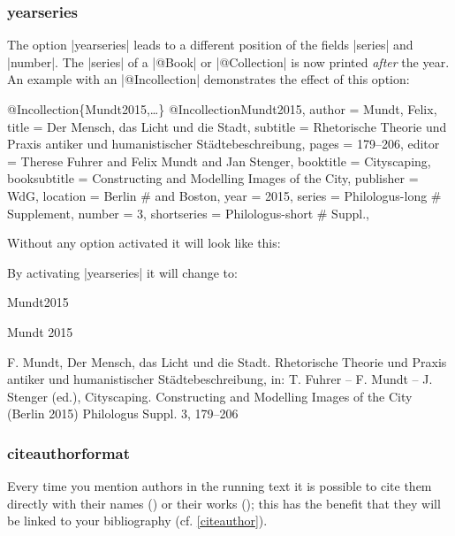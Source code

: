\documentclass[a4paper,
10pt,
greek,
french,
spanish,
italian,
ngerman,
english
]{ltxdoc}
\begin{document}

\subsubsection{yearseries}\label{yearseries}
The option |yearseries| leads to a different position of the fields |series| and |number|.
The |series| of a |@Book| or |@Collection| is now printed \emph{after} the year.
An example with an |@Incollection| demonstrates the effect of this option:
 
\begin{bibexample}[label=Mundt2015]{{@}Incollection\{Mundt2015,…\}}
@Incollection{Mundt2015,
  author       = {Mundt, Felix},
  title        = {Der Mensch, das Licht und die Stadt},
  subtitle     = {Rhetorische Theorie und Praxis antiker und humanistischer Städtebeschreibung},
  pages        = {179--206},
  editor       = {Therese Fuhrer and Felix Mundt and Jan Stenger},
  booktitle    = {Cityscaping},
  booksubtitle = {Constructing and Modelling Images of the City},
  publisher    = WdG,
  location     = Berlin #{ and Boston}, %
  year         = {2015},
  series       = Philologus-long #{ Supplement},
  number       = {3},
  shortseries  = Philologus-short #{ Suppl.},
}
\end{bibexample}

Without any option activated it will look like this:
 
By activating |yearseries| it will change to:
\begin{bibbox}{Mundt2015}\footnotesize
\parbox[t]{1.7cm}{Mundt 2015} \parbox[t]{9cm}{F. Mundt, Der Mensch, das Licht und die Stadt. Rhetorische Theorie und Praxis antiker und humanistischer Städtebeschreibung, in: T. Fuhrer -- F. Mundt -- J. Stenger (ed.), Cityscaping. Constructing and Modelling Images of the City (Berlin 2015) {\color{red}Philologus Suppl. 3,} 179–206}
\end{bibbox}

\subsubsection{citeauthorformat}\label{citeauthorformat}
Every time you mention authors in the running text it is possible to cite them 
directly with their names () or their works  ();
this has the benefit that they will be linked to your bibliography (cf. \cref{citeauthor}).
\end{document}
